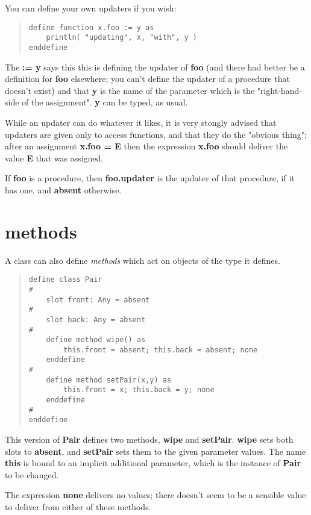 \documentclass{report}
\begin{document}
You can define your own updaters if you wish:

\begin{quote}
\begin{verbatim}
define function x.foo := y as
    println( "updating", x, "with", y )
enddefine
\end{verbatim}
\end{quote}


The {\bf := y} says this this is defining the updater of {\bf foo} (and there had
better be a definition for {\bf foo} elsewhere; you can't define the updater of a
procedure that doesn't exist) and that {\bf y} is the name of the parameter which
is the "right-hand-side of the assignment". {\bf y} can be typed, as usual.

While an updater can do whatever it likes, it is very stongly advised that
updaters are given only to access functions, and that they do the "obvious
thing"; after an assignment {\bf x.foo = E} then the expression {\bf x.foo} should
deliver the value {\bf E} that was assigned.

If {\bf foo} is a procedure, then {\bf foo.updater} is the updater of that procedure,
if it has one, and {\bf absent} otherwise.


\section{methods}


A class can also define {\em methods} which act on objects of the type it
defines.

\begin{quote}
\begin{verbatim}
define class Pair
#
    slot front: Any = absent
#
    slot back: Any = absent
#
    define method wipe() as
        this.front = absent; this.back = absent; none
    enddefine
#
    define method setPair(x,y) as
        this.front = x; this.back = y; none
    enddefine
#
enddefine
\end{verbatim}
\end{quote}


This version of {\bf Pair} defines two methods, {\bf wipe} and {\bf setPair}. {\bf wipe} sets
both slots to {\bf absent}, and {\bf setPair} sets them to the given parameter values.
The name {\bf this} is bound to an implicit additional parameter, which is the
instance of {\bf Pair} to be changed.

The expression {\bf none} delivers no values; there doesn't seem to be a sensible
value to deliver from either of these methods.
\end{document}
